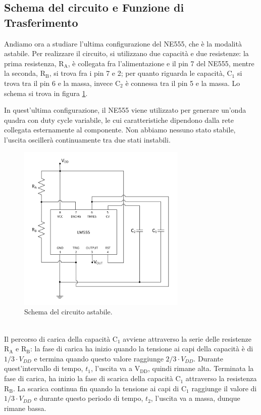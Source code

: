 \documentclass{report}
\begin{document}
\subsection{Schema del circuito e Funzione di Trasferimento}
Andiamo ora a studiare l'ultima configurazione del NE555, che è la modalità astabile. Per realizzare il circuito, si utilizzano due capacità e due resistenze: la prima resistenza, $\mathrm{R_A}$, è collegata fra l'alimentazione e il pin 7 del NE555, mentre la seconda, $\mathrm{R_B}$, si trova fra i pin 7 e 2; per quanto riguarda le capacità, $\mathrm{C_1}$ si trova tra il pin 6 e la massa, invece $\mathrm{C_2}$ è connessa tra il pin 5 e la massa. Lo schema si trova in figura \ref{figura:schema3}. \par
In quest'ultima configurazione, il NE555 viene utilizzato per generare un'onda quadra con duty cycle variabile, le cui caratteristiche dipendono dalla rete collegata esternamente al componente. Non abbiamo nessuno stato stabile, l'uscita oscillerà continuamente tra due stati instabili.
\begin{figure}[h!]
	\centering
	\includegraphics[height=8cm]{immagini/schema3}
	\caption{Schema del circuito astabile.}
	\label{figura:schema3}
\end{figure}
\\Il percorso di carica della capacità $\mathrm{C_1}$ avviene attraverso la serie delle resistenze $\mathrm{R_A}$ e $\mathrm{R_B}$: la fase di carica ha inizio quando la tensione ai capi della capacità è di $1/3\cdot V_{DD}$ e termina quando questo valore raggiunge $2/3\cdot V_{DD}$. Durante quest'intervallo di tempo, $t_1$, l'uscita va a $\mathrm{V_{DD}}$, quindi rimane alta. Terminata la fase di carica, ha inizio la fase di scarica della capacità $\mathrm{C_1}$ attraverso la resistenza $\mathrm{R_B}$. La scarica continua fin quando la tensione ai capi di $\mathrm{C_1}$ raggiunge il valore di $1/3\cdot V_{DD}$ e durante questo periodo di tempo, $t_2$, l'uscita va a massa, dunque rimane bassa. 
\end{document}
